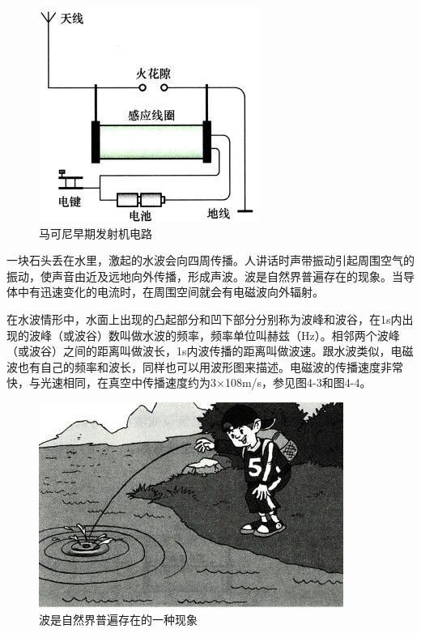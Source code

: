 \documentclass[12pt,UTF8]{ctexbook}
\begin{document}
\begin{figure}[htbp]
	\centering
	\includegraphics[width=0.7\linewidth]{45}
	\caption{马可尼早期发射机电路}
	\label{fig:1}
\end{figure}

一块石头丢在水里，激起的水波会向四周传播。人讲话时声带振动引起周围空气的振动，使声音由近及远地向外传播，形成声波。波是自然界普遍存在的现象。当导体中有迅速变化的电流时，在周围空间就会有电磁波向外辐射。

在水波情形中，水面上出现的凸起部分和凹下部分分别称为波峰和波谷，在1s内出现的波峰（或波谷）数叫做水波的频率，频率单位叫赫兹（Hz）。相邻两个波峰（或波谷）之间的距离叫做波长，1s内波传播的距离叫做波速。跟水波类似，电磁波也有自己的频率和波长，同样也可以用波形图来描述。电磁波的传播速度非常快，与光速相同，在真空中传播速度约为3×108m/s，参见图4-3和图4-4。

\begin{figure}[htbp]
	\centering
	\includegraphics[width=0.7\linewidth]{46}
	\caption{波是自然界普遍存在的一种现象}
	\label{fig:1}
\end{figure}
\end{document}
